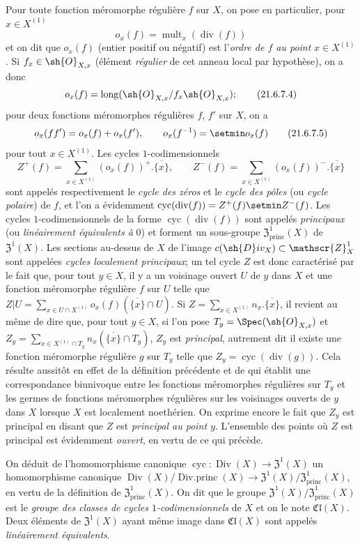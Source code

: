 \begin{env}[21.6.7]
Pour toute fonction méromorphe régulière $f$ sur $X$, on pose en particulier, pour $x\in X^{(1)}$
\[
\label{IV.21.6.7.3}
  o_x(f)=\operatorname{mult}_x(\operatorname{div}(f))
  \tag{21.6.7.3}
\]
et on dit que $o_x(f)$ (entier positif ou négatif) est l'\emph{ordre de $f$ au point} $x\in X^{(1)}$.
Si $f_x\in\sh{O}_{X,x}$ (élément \emph{régulier} de cet anneau local par hypothèse), on a donc
\[
\label{IV.21.6.7.4}
  o_x(f)=\operatorname{long}(\sh{O}_{X,x}/f_x\sh{O}_{X,x});
  \tag{21.6.7.4}
\]
pour deux fonctions méromorphes régulières $f$, $f'$ sur $X$, on a
\[
\label{IV.21.6.7.5}
  o_x(ff')=o_x(f)+o_x(f'),\qquad o_x(f^{-1})=\setmin o_x(f)
  \tag{21.6.7.5}
\]
pour tout $x\in X^{(1)}$.
Les cycles $1$-codimensionnels
\[
  Z^+(f)=\sum_{x\in X^{(1)}}(o_x(f))^+.\overline{\{x\}},\qquad
  Z^-(f)=\sum_{x\in X^{(1)}}(o_x(f))^-.\overline{\{x\}}
\]
sont appelés respectivement le \emph{cycle des zéros} et le \emph{cycle des pôles} (ou \emph{cycle polaire}) de $f$, et l'on a évidemment $\operatorname{cyc}(\operatorname{div}(f))=Z^+(f)\setmin Z^-(f)$.
Les cycles $1$-codimensionnels de la forme $\operatorname{cyc}(\operatorname{div}(f))$ sont appelés \emph{principaux} (ou \emph{linéairement équivalents à} $0$) et forment un sous-groupe $\mathfrak{Z}^1_\mathrm{princ}(X)$ de $\mathfrak{Z}^1(X)$.
Les sections au-dessus de $X$ de l'image $c(\sh{D}iv_X)\subset\mathscr{Z}_X^1$ sont
appelées \emph{cycles localement principaux};
un tel cycle $Z$ est donc caractérisé par le fait que, pour tout $y\in X$, il y a un voisinage ouvert $U$ de $y$ dans $X$ et une fonction méromorphe régulière $f$ sur $U$ telle que $Z|U=\sum_{x\in U\cap X^{(1)}}o_x(f)(\overline{\{x\}}\cap U)$.
Si $Z=\sum_{x\in X^{(1)}}n_x.\overline{\{x\}}$, il revient au même de dire que, pour tout $y\in X$, si l'on pose $T_y=\Spec(\sh{O}_{X,x})$ et $Z_y=\sum_{x\in X^{(1)}\cap T_y}n_x(\overline{\{x\}}\cap T_y)$, $Z_y$ est \emph{principal}, autrement dit il existe une fonction méromorphe régulière $g$ sur $T_y$ telle que $Z_y=\operatorname{cyc}(\operatorname{div}(g))$.
Cela résulte aussitôt en effet de la définition précédente et de  qui établit une correspondance biunivoque entre les fonctions méromorphes régulières sur $T_y$ et les germes de fonctions méromorphes régulières sur les voisinages ouverts de $y$ dans $X$ lorsque $X$ est localement noethérien.
On exprime encore le fait que $Z_y$ est principal en disant que $Z$ est \emph{principal au point $y$}.
L'ensemble des points où $Z$ est principal est évidemment \emph{ouvert}, en vertu de ce qui précède.

On déduit de l'homomorphisme canonique $\operatorname{cyc}:\operatorname{Div}(X)\to\mathfrak{Z}^1(X)$ un homomorphisme canonique $\operatorname{Div}(X)/\operatorname{Div.princ}(X)\to\mathfrak{Z}^1(X)/\mathfrak{Z}^1_\mathrm{princ}(X)$, en vertu de la définition de $\mathfrak{Z}^1_\mathrm{princ}(X)$.
On dit que le groupe $\mathfrak{Z}^1(X)/\mathfrak{Z}^1_\mathrm{princ}(X)$ est le \emph{groupe des classes de cycles $1$-codimensionnels} de $X$ et on le note $\mathfrak{Cl}(X)$.
Deux éléments de $\mathfrak{Z}^1(X)$ ayant même image dans $\mathfrak{Cl}(X)$ sont appelés \emph{linéairement équivalents}.
\end{env}

